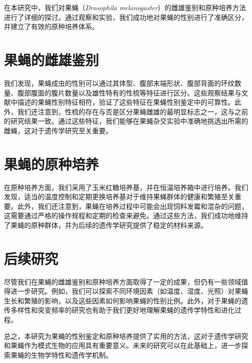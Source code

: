 \documentclass[AutoFakeBold]{LZUThesis}
\begin{document}
在本研究中，我们对果蝇（\textit{Drosophila melanogaster}）的雌雄鉴别和原种培养方法进行了详细的探讨。通过观察和实验，我们成功地对果蝇的性别进行了准确区分，并建立了有效的原种培养体系。

\section{果蝇的雌雄鉴别}

我们发现，果蝇成虫的性别可以通过其体型、腹部末端形状、腹部背面的环纹数量、腹部腹面的腹片数量以及雄性特有的性梳等特征进行区分。这些观察结果与文献中描述的果蝇性别特征相符，验证了这些特征在果蝇性别鉴定中的可靠性。此外，我们还注意到，性梳的存在与否是区分果蝇雌雄的最明显标志之一，这与之前的研究结果一致。通过这些特征，我们能够在果蝇杂交实验中准确地挑选出所需的雌蝇，这对于遗传学研究至关重要。

\section{果蝇的原种培养}

在原种培养方面，我们采用了玉米红糖培养基，并在恒温培养箱中进行培养。我们发现，适当的温度控制和定期更换培养基对于维持果蝇群体的健康和繁殖至关重要。此外，我们还注意到，果蝇在培养过程中可能会出现饲料发霉和混杂的问题，这需要通过严格的操作规程和定期的检查来避免。通过这些方法，我们成功地维持了果蝇的原种群体，并为后续的遗传学研究提供了稳定的材料来源。

\section{后续研究}

尽管我们在果蝇的雌雄鉴别和原种培养方面取得了一定的成果，但仍有一些领域值得进一步研究。例如，我们可以探索不同环境因素（如温度、湿度、光照）对果蝇生长和繁殖的影响，以及这些因素如何影响果蝇的性别比例。此外，对于果蝇的遗传多样性和突变频率的研究也有助于我们更好地理解果蝇的遗传学特性和进化过程。

总之，本研究为果蝇的性别鉴定和原种培养提供了实用的方法，这对于遗传学研究和果蝇作为模式生物的应用具有重要意义。未来的研究可以在此基础上，进一步探索果蝇的生物学特性和遗传学机制。

\backmatter


\printbib






\end{document}
